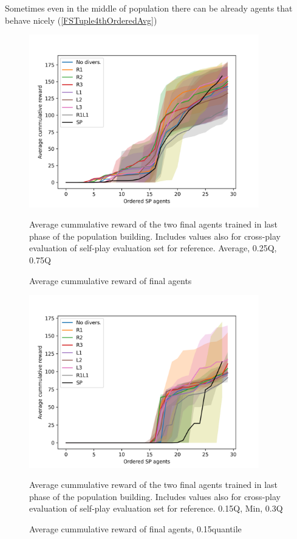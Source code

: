Sometimes even in the middle of population there can be already agents that behave nicely (\ref{FSTuple4thOrderedAvg})

\begin{figure}[!ht]
    \centering
    \includegraphics*[width=10cm]{../img/SimpleCNNOrderedAvg.png}

    \caption{Average cummulative reward of final agents}
    \label{SimpleCNNOrderedAvg}
    \medskip
    \small 
    Average cummulative reward of the two final agents trained in last phase of the population building.
    Includes values also for cross-play evaluation of self-play evaluation set for reference. 
    Average, 0.25Q, 0.75Q

\end{figure}

\begin{figure}[!ht]
    \centering
    \includegraphics*[width=10cm]{../img/SimpleCNNOrderedAvg0.15Q.png}

    \caption{Average cummulative reward of final agents, 0.15quantile}
    \label{SimpleCNNOrderedAvg0.15Q}
    \medskip
    \small 
    Average cummulative reward of the two final agents trained in last phase of the population building.
    Includes values also for cross-play evaluation of self-play evaluation set for reference. 
    0.15Q, Min, 0.3Q

\end{figure}


